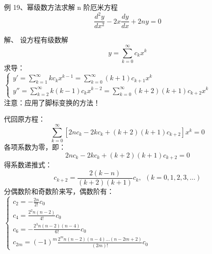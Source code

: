 \begin{frame}
	\begin{exampleblock} {例 19、幂级数方法求解 n 阶厄米方程}
	\begin{equation*}
		\frac{d^2 y}{d x^2} -2x \frac{d y}{d x} +2n y =0 
	\end{equation*}     
	\end{exampleblock}	
	\alert{解、} 	设方程有级数解
	\begin{equation*}
		y=\sum_{k=0}^{\infty} c_k x^k
	\end{equation*}     
	求导：\\
	$\begin{cases}
		y' = \sum\limits_{k=1}^{\infty} k c_k x^{k-1} =\sum\limits_{k=0}^{\infty} (k+1) c_{k+1} x^{k}\\
		y'' = \sum\limits_{k=2}^{\infty} k (k-1) c_k x^{k-2} =  \sum\limits_{k=0}^{\infty} (k+2) (k+1) c_{k+2} x^k
	\end{cases}$ \\
	注意：应用了脚标变换的方法！
 \end{frame}

\begin{frame}
	代回原方程：
	\begin{equation*}
		\sum_{k=0}^{\infty} [ 2nc_k -2kc_k +(k+2)(k+1) c_{k+2}  ] x^k  =0
	\end{equation*}  
	各项系数为零，即： 
	\begin{equation*}
		2nc_k -2kc_k +(k+2)(k+1) c_{k+2} =0
	\end{equation*}   
	得系数递推式：
	\begin{equation*}
		c_{k+2} = \frac{ 2(k-n)}{(k+2)(k+1) } c_k, ~~  \left( k=0,1,2,3, ...  \right)
	\end{equation*}   
	分偶数阶和奇数阶来写，偶数阶有： \\
	$\displaystyle \begin{cases}
		c_2 =- \frac{2n}{2!} c_0\\
		c_4 = \frac{2^2n(n-2)}{4!} c_0 \\
		c_6 = -\frac{2^3n(n-2)(n-4)}{6!} c_0 \\
		c_{2m} = (-1) ^m \frac{2^mn(n-2)(n-4) ... (n-2m+2)  } {(2m)!} c_0
	\end{cases}$ \\
\end{frame}

